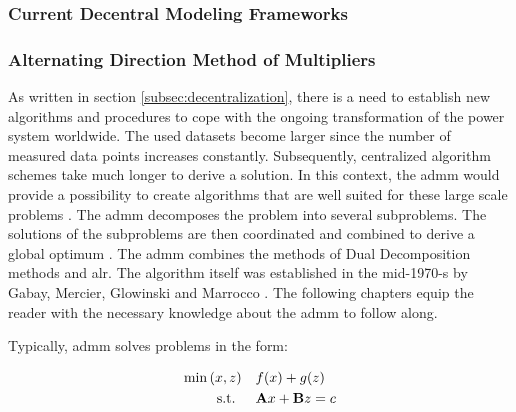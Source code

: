 \subsubsection{Current Decentral Modeling Frameworks}

\subsubsection{Alternating Direction Method of Multipliers}
As written in section \ref{subsec:decentralization}, there is a need to establish new algorithms and procedures to cope with the ongoing transformation of the power system worldwide. The used datasets become larger since the number of measured data points increases constantly. Subsequently, centralized algorithm schemes take much longer to derive a solution. In this context, the \gls{admm} would provide a possibility to create algorithms that are well suited for these large scale problems \citep{Boyd-2010-DistributedOptimizationStatistical}. The \gls{admm} decomposes the problem into several subproblems. The solutions of the subproblems are then coordinated and combined to derive a global optimum \citep{Boyd-2010-DistributedOptimizationStatistical}. The \gls{admm} combines the methods of Dual Decomposition methods and \gls{alr}. The algorithm itself was established in the mid-1970-s by Gabay, Mercier, Glowinski and Marrocco \citep{Boyd-2010-DistributedOptimizationStatistical}. The following chapters equip the reader with the necessary knowledge about the \gls{admm} to follow along.

Typically, \gls{admm} solves problems in the form:

\begin{subequations}
	\begin{align}
		\min{(x, z)} \quad & f(x) + g(z) \\
		\text{s.t. } \quad & \vb{A}x + \vb{B}z = c
	\end{align}
\end{subequations}
